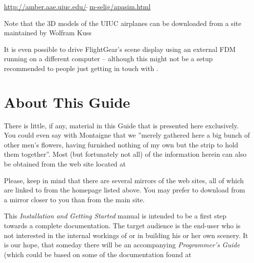 \href{http://amber.aae.uiuc.edu/~m-selig/apasim.html}{http://amber.aae.uiuc.edu/$\tilde{~~}$m-selig/apasim.html}
\medskip

\noindent
Note that the 3D models of the UIUC airplanes can be downloaded from a site maintained by Wolfram Kuss
\medskip

\medskip

It is even possible to drive FlightGear's scene display using an external FDM
running on a different computer -- although this might not be a setup recommended to people just
getting in touch with \FlightGear.


\section{About This Guide}

There is little, if any, material in this Guide that is presented here exclusively. You
could even say with Montaigne that we ''merely gathered here a big bunch of other men's
flowers, having furnished nothing of my own but the strip to hold them together''. Most
(but fortunately not all) of the information herein can also be obtained from the
\FlightGear{} web site located at
\medskip

\medskip

Please, keep in mind that there are several mirrors of the \FlightGear{} web sites, all
of which are linked to from the \FlightGear{} homepage listed above.
You may prefer to download \FlightGear{} from a mirror closer to you than from the
main site.

This \textit{\FlightGear{} Installation and Getting Started} manual is intended to be a
first step towards a complete \FlightGear{} documentation. The target
audience is the end-user who is not interested in the internal workings of 
or in building his or her own scenery. It is our hope, that someday there
will be an accompanying \textit{\FlightGear{} Programmer's Guide} (which could be based on some of the documentation found at
 \medskip

